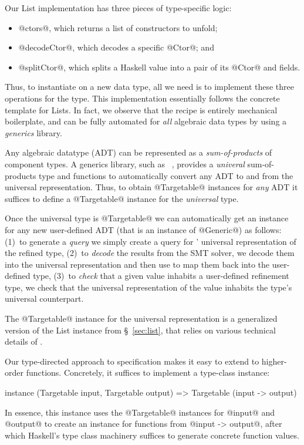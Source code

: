 % 
Our List implementation has three pieces of type-specific logic:
%
\begin{itemize}
\item{@ctors@}, which returns a list of constructors to unfold;
%
\item{@decodeCtor@}, which decodes a specific @Ctor@; and
%
\item{@splitCtor@}, which splits a Haskell value into a pair of its @Ctor@ and fields. 
\end{itemize}

Thus, to instantiate \toolname on a new data type, all we need is to 
implement these three operations for the type. This implementation
essentially follows the concrete template for Lists.
In fact, we observe that the recipe is entirely mechanical boilerplate,  
and can be fully automated for \emph{all} algebraic data types by using 
a \emph{generics} library.

Any algebraic datatype (ADT) can be represented as a \emph{sum-of-products} 
of component types. A generics library, such as \GhcGenerics~\cite{magalhaes_generic_2010}, 
provides a \emph{univeral} sum-of-products type and functions to automatically 
convert any ADT to and from the universal representation.
Thus, to obtain @Targetable@ instances for \emph{any} ADT it suffices
to define a @Targetable@ instance for the \emph{universal} type.

Once the universal type is @Targetable@ we can automatically get an 
instance for any new user-defined ADT (that is an instance of @Generic@) as follows:
%
(1)~to generate a \emph{query} we simply create a query for 
    \GhcGenerics' universal representation of the refined type,
%
(2)~to \emph{decode} the results from the SMT solver, we 
    decode them into the universal representation and then use 
    \GhcGenerics to map them back into the user-defined type,
%
(3)~to \emph{check} that a given value inhabits a user-defined 
    refinement type, we check that the universal representation 
    of the value inhabits the type's universal counterpart.

The @Targetable@ instance for the universal representation is a 
generalized version of the List instance from \S~\ref{sec:list}, 
that relies on various technical details of \GhcGenerics.

Our type-directed approach to specification makes it easy to extend
\toolname to higher-order functions. Concretely, it suffices to 
implement a type-class instance:
%
\begin{code}
  instance (Targetable input, Targetable output) 
    => Targetable (input -> output)
\end{code}
%
In essence, this instance uses the @Targetable@ 
instances for @input@ and @output@ to 
create an instance for functions from @input -> output@,
after which Haskell's type class machinery suffices to 
generate concrete function values.

